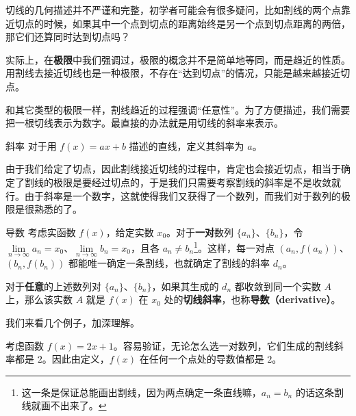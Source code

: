 



切线的几何描述并不严谨和完整，初学者可能会有很多疑问，比如割线的两个点靠近切点的时候，如果其中一个点到切点的距离始终是另一个点到切点距离的两倍，那它们还算同时达到切点吗？

实际上，在\textbf{极限}中我们强调过，极限的概念并不是简单地等同，而是趋近的性质。用割线去接近切线也是一种极限，不存在“达到切点”的情况，只能是越来越接近切点。

和其它类型的极限一样，割线趋近的过程强调“任意性”。为了方便描述，我们需要把一根切线表示为数字。最直接的办法就是用切线的斜率来表示。

\begin{definition}{斜率}
对于用 $f(x)=ax+b$ 描述的直线，定义其斜率为 $a$。
\end{definition}

由于我们给定了切点，因此割线接近切线的过程中，肯定也会接近切点，相当于确定了割线的极限是要经过切点的，于是我们只需要考察割线的斜率是不是收敛就行。由于斜率是一个数字，这就使得我们又获得了一个数列，而我们对于数列的极限是很熟悉的了。

\begin{definition}{导数}\label{Der2_def1}
考虑实函数 $f(x)$，给定实数 $x_0$。对于\textbf{一对}数列 $\{a_n\}$、$\{b_n\}$，令 $\lim\limits_{n\to\infty}a_n=x_0$、$\lim\limits_{n\to\infty}b_n=x_0$，且各 $a_n\not=b_n$\footnote{这一条是保证总能画出割线，因为两点确定一条直线嘛，$a_n=b_n$ 的话这条割线就画不出来了。}。这样，每一对点 $(a_n, f(a_n))$、$ (b_n, f(b_n))$ 都能唯一确定一条割线，也就确定了割线的斜率 $d_n$。

对于\textbf{任意}的上述数列对 $\{a_n\}$、$\{b_n\}$，如果其生成的 $d_n$ 都收敛到同一个实数 $A$ 上，那么该实数 $A$ 就是 $f(x)$ 在 $x_0$ 处的\textbf{切线斜率}，也称\textbf{导数（derivative）}。
\end{definition}

我们来看几个例子，加深理解。

\begin{example}{}
考虑函数 $f(x)=2x+1$。容易验证，无论怎么选一对数列，它们生成的割线斜率都是 $2$。因此由定义，$f(x)$ 在任何一个点处的导数值都是 $2$。
\end{example}

